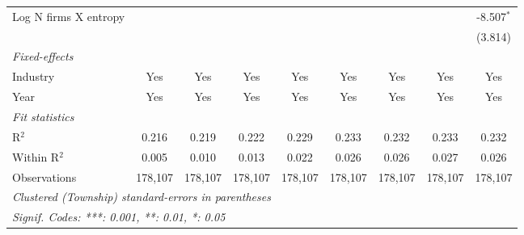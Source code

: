 \begin{tabular}{lcccccccc}
   Log N firms X entropy                                 &                  &                 &                  &                  &                  &                  &                  & -8.507$^{*}$\\   
                                                         &                  &                 &                  &                  &                  &                  &                  & (3.814)\\   
   \midrule
   \emph{Fixed-effects}\\
   Industry                                              & Yes              & Yes             & Yes              & Yes              & Yes              & Yes              & Yes              & Yes\\  
   Year                                                  & Yes              & Yes             & Yes              & Yes              & Yes              & Yes              & Yes              & Yes\\  
   \midrule
   \emph{Fit statistics}\\
   R$^2$                                                 & 0.216            & 0.219           & 0.222            & 0.229            & 0.233            & 0.232            & 0.233            & 0.232\\  
   Within R$^2$                                          & 0.005            & 0.010           & 0.013            & 0.022            & 0.026            & 0.026            & 0.027            & 0.026\\  
   Observations                                          & 178,107          & 178,107         & 178,107          & 178,107          & 178,107          & 178,107          & 178,107          & 178,107\\  
   \midrule \midrule
   \multicolumn{9}{l}{\emph{Clustered (Township) standard-errors in parentheses}}\\
   \multicolumn{9}{l}{\emph{Signif. Codes: ***: 0.001, **: 0.01, *: 0.05}}\\
\end{tabular}
\par\endgroup
